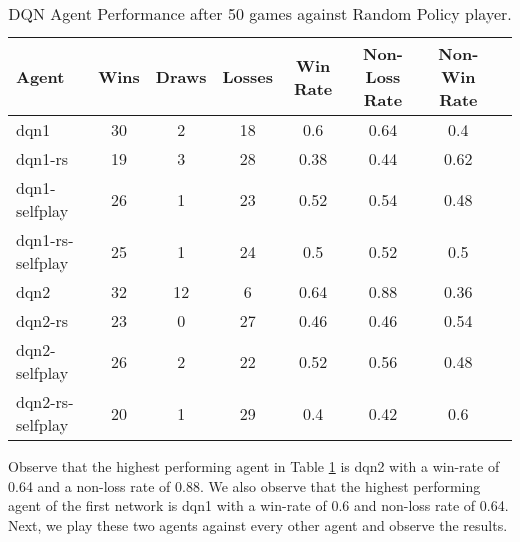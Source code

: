 \documentclass[../report.tex]{subfiles}
\begin{document}
\begin{table}[!htbp]
    \centering
    \caption{DQN Agent Performance after 50 games against Random Policy player.}\label{table:dqns-v-random}
    \begin{tabular}{lccccccc}
        \toprule
        Agent            & Wins & Draws & Losses & Win Rate & Non-Loss Rate & Non-Win Rate \\
        \midrule
        dqn1             & 30   & 2     & 18     & 0.6      & 0.64          & 0.4          \\
        dqn1-rs          & 19   & 3     & 28     & 0.38     & 0.44          & 0.62         \\
        dqn1-selfplay    & 26   & 1     & 23     & 0.52     & 0.54          & 0.48         \\
        dqn1-rs-selfplay & 25   & 1     & 24     & 0.5      & 0.52          & 0.5          \\
        dqn2             & 32   & 12    & 6      & 0.64     & 0.88          & 0.36         \\
        dqn2-rs          & 23   & 0     & 27     & 0.46     & 0.46          & 0.54         \\
        dqn2-selfplay    & 26   & 2     & 22     & 0.52     & 0.56          & 0.48         \\
        dqn2-rs-selfplay & 20   & 1     & 29     & 0.4      & 0.42          & 0.6          \\
        \bottomrule
    \end{tabular}
\end{table}

Observe that the highest performing agent in Table \ref{table:dqns-v-random} is dqn2 with a win-rate of 0.64 and a non-loss rate of 0.88. We also observe that the highest performing agent of the first network is dqn1 with a win-rate of 0.6 and non-loss rate of 0.64. Next, we play these two agents against every other agent and observe the results.
\end{document}
